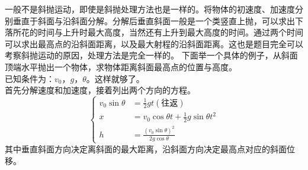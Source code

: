 \begin{casetypebox}[title={\strut\textcolor{white}{\bfseries 常见题型：斜面抛出最高点}}]
  一般不是斜抛运动，即使是斜抛处理方法也是一样的。将物体的初速度、加速度分别垂直于斜面与沿斜面分解。分解后垂直斜面一般是一个类竖直上抛，可以求出下落所花的时间与上升时最大高度，当然还有上升到最大高度的时间。通过两个时间可以求出最高点的沿斜面距离，以及最大射程的沿斜面距离。这也是题目完全可以考察斜抛运动的原因，处理方法是完全一样的。
  下面举一个具体的例子，从斜面顶端水平抛出一个物体，求物体距离斜面最高点的位置与高度。\\
  已知条件为：$v_0$，$g$，$\theta$。这样就够了。\\
  首先分解速度和加速度，接着列出两个方向的方程。
  \[
    \left\{
    \begin{aligned}
      v_0\sin\theta                          & = \frac12gt (\text{往返}) \\
      x&=v_0\cos\theta t+\frac12g\sin\theta t^2                   \\
      h&=\frac{(v_0\sin\theta)^2}{2g\cos\theta}
    \end{aligned}
    \right.
  \]
  其中垂直斜面方向决定离斜面的最大距离，沿斜面方向决定最高点对应的斜面位移。
\end{casetypebox}